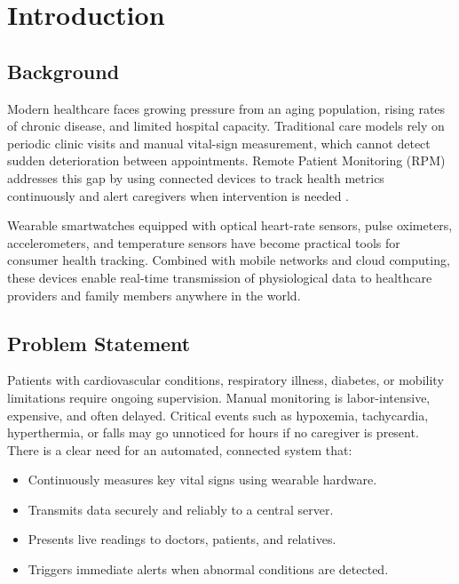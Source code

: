 \documentclass[12pt,a4paper]{report}
\begin{document}
\tableofcontents
\listoffigures
\listoftables

\clearpage
{}

\chapter{Introduction}

\section{Background}

Modern healthcare faces growing pressure from an aging population, rising rates of chronic disease, and limited hospital capacity. Traditional care models rely on periodic clinic visits and manual vital-sign measurement, which cannot detect sudden deterioration between appointments. Remote Patient Monitoring (RPM) addresses this gap by using connected devices to track health metrics continuously and alert caregivers when intervention is needed \cite{rpm_survey}.

Wearable smartwatches equipped with optical heart-rate sensors, pulse oximeters, accelerometers, and temperature sensors have become practical tools for consumer health tracking. Combined with mobile networks and cloud computing, these devices enable real-time transmission of physiological data to healthcare providers and family members anywhere in the world.

\section{Problem Statement}

Patients with cardiovascular conditions, respiratory illness, diabetes, or mobility limitations require ongoing supervision. Manual monitoring is labor-intensive, expensive, and often delayed. Critical events such as hypoxemia, tachycardia, hyperthermia, or falls may go unnoticed for hours if no caregiver is present. There is a clear need for an automated, connected system that:

\begin{itemize}[leftmargin=*]
  \item Continuously measures key vital signs using wearable hardware.
  \item Transmits data securely and reliably to a central server.
  \item Presents live readings to doctors, patients, and relatives.
  \item Triggers immediate alerts when abnormal conditions are detected.
\end{itemize}
\end{document}
